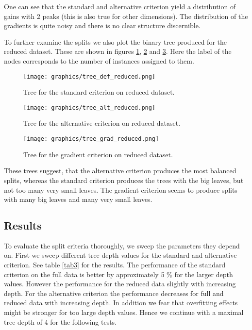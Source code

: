 \documentclass[draft]{article}
\begin{document}
One can see that the standard and alternative criterion yield a distribution  
of gains with 2 peaks (this is also true for other dimensions).
The distribution of the gradients is quite noisy and there is no clear structure discernible.

\FloatBarrier

To further examine the splits we also plot the binary tree produced for the reduced dataset.
These are shown in figures \ref{fig2d}, \ref{fig2e} and \ref{fig2f}. 
Here the label of the nodes corresponds to the number of instances assigned to them.


\begin{figure}[h]
	\centering
	\texttt{[image: graphics/tree\_def\_reduced.png]}
	\caption{Tree for the standard criterion on reduced dataset.}
	\label{fig2d}
\end{figure}

\begin{figure}[h]
	\centering
	\texttt{[image: graphics/tree\_alt\_reduced.png]}
	\caption{Tree for the alternative criterion on reduced dataset.}
	\label{fig2e}
\end{figure}

\begin{figure}[h]
	\centering
	\texttt{[image: graphics/tree\_grad\_reduced.png]}
	\caption{Tree for the gradient criterion on reduced dataset.}
	\label{fig2f}
\end{figure}

These trees suggest, that the alternative criterion produces the most balanced splits, whereas the 
standard criterion produces the trees with the big leaves, but not too many very small leaves.
The gradient criterion seems to produce splits with many big leaves and many very small leaves.

\FloatBarrier

\subsection{Results}

To evaluate the split criteria thoroughly, we sweep the parameters they depend on.
\newline
First we sweep different tree depth values for the standard and alternative criterion.
See table \ref{tab3} for the results. The performance of the standard criterion on the full data 
is better by approximately 5 \% for the larger depth values.
However the performance for the reduced data slightly with increasing depth.
For the alternative criterion the performance decreases for full and reduced data with increasing depth.
In addition we fear that overfitting effects might be stronger for too large depth values.
Hence we continue with a maximal tree depth of 4 for the following tests.
\end{document}
